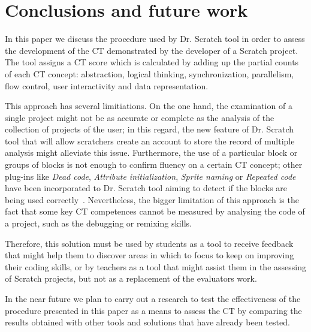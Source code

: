 \documentclass[a4paper,11pt]{article}
\begin{document}
\section{Conclusions and future work}
\label{sec:conclusions}
In this paper we discuss the procedure used by Dr. Scratch tool in order to assess the development of the CT demonstrated by the developer of a Scratch project. The tool assigns a CT score which is calculated by adding up the partial counts of each CT concept: abstraction, logical thinking, synchronization, parallelism, flow control, user interactivity and data representation.

This approach has several limitiations. On the one hand, the examination of a single project might not be as accurate or complete as the analysis of the collection of projects of the user; in this regard, the new feature of Dr. Scratch tool that will allow scratchers create an account to store the record of multiple analysis might alleviate this issue. Furthermore, the use of a particular block or groups of blocks is not enough to confirm fluency on a certain CT concept; other plug-ins like \textit{Dead code}, \textit{Attribute initialization}, \textit{Sprite naming} or \textit{Repeated code} have been incorporated to Dr. Scratch tool aiming to detect if the blocks are being used correctly~\cite{moreno2014automatic}. Nevertheless, the bigger limitation of this approach is the fact that some key CT competences cannot be measured by analysing the code of a project, such as the debugging or remixing skills. 

Therefore, this solution must be used by students as a tool to receive feedback that might help them to discover areas in which to focus to keep on improving their coding skills, or by teachers as a tool that might assist them in the assessing of Scratch projects, but not as a replacement of the evaluators work.

In the near future we plan to carry out a research to test the effectiveness of the procedure presented in this paper as a means to assess the CT by comparing the results obtained with other tools and solutions that have already been tested.
\newpage


\end{document}
